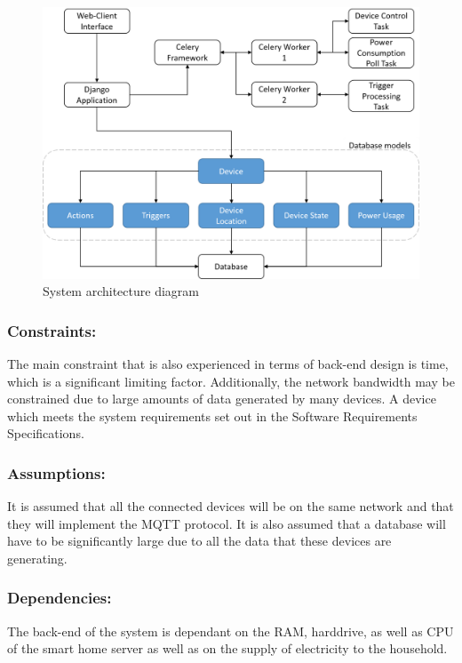 \documentclass[10pt,twocolumn]{witseiepaper}
\begin{document}
	\begin{figure}[H]
		\centering
		\includegraphics[width=\linewidth]{Sys_Overview}
		\caption{System architecture diagram}
		\label{fig:Sys_Overview}
	\end{figure}
	
	
	\subsubsection{Constraints:}
	The main constraint that is also experienced in terms of back-end design is time, which is a significant limiting factor. Additionally, the network bandwidth may be constrained due to large amounts of data generated by many devices. 
	A device which meets the system requirements set out in the Software Requirements Specifications. 
	\subsubsection{Assumptions:}
	It is assumed that all the connected devices will be on the same network and that they will implement the MQTT protocol. It is also assumed that a database will have to be significantly large due to all the data that these devices are generating. 
	\subsubsection{Dependencies:}
	The back-end of the system is dependant on the RAM, harddrive, as well as CPU of the smart home server as well as on the supply of electricity to the household. 

	
\end{document}
